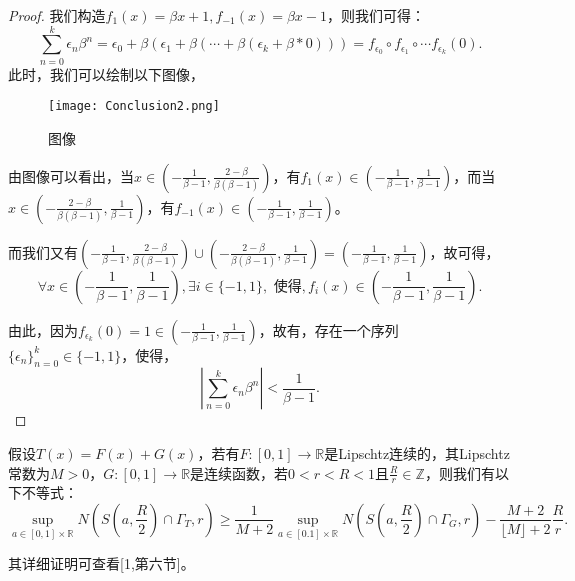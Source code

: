 \begin{proof}
      我们构造$f_1(x)=\beta x+1,f_{-1}(x)=\beta x -1$，则我们可得：
      $$
            \sum_{n=0}^k\epsilon_n\beta^n=\epsilon_0+\beta(\epsilon_1+\beta(\cdots+\beta(\epsilon_k+\beta*0)))=f_{\epsilon_0}\circ f_{\epsilon_1}\circ \cdots f_{\epsilon_k}(0).
      $$
      此时，我们可以绘制以下图像，
      \begin{figure*}[htbp]
            \centering
            \texttt{[image: Conclusion2.png]}
            \caption{图像}
            \label{fig:C1onclusion2}
      \end{figure*}

      由图像可以看出，当$x\in(-\frac{1}{\beta-1},\frac{2-\beta}{\beta(\beta-1)})$，有$f_1(x)\in(-\frac{1}{\beta-1},\frac{1}{\beta-1})$，而当$x\in(-\frac{2-\beta}{\beta(\beta-1)},\frac{1}{\beta-1})$，有$f_{-1}(x)\in(-\frac{1}{\beta-1},\frac{1}{\beta-1})$。

      而我们又有$(-\frac{1}{\beta-1},\frac{2-\beta}{\beta(\beta-1)})\cup(-\frac{2-\beta}{\beta(\beta-1)},\frac{1}{\beta-1})=(-\frac{1}{\beta-1},\frac{1}{\beta-1})$，故可得，
      $$
            \forall x\in(-\frac{1}{\beta-1},\frac{1}{\beta-1}), \exists i\in\{-1,1\},\mbox{ 使得},f_i(x)\in(-\frac{1}{\beta-1},\frac{1}{\beta-1}).
      $$

      由此，因为$f_{\epsilon_k}(0)=1\in(-\frac{1}{\beta-1},\frac{1}{\beta-1})$，故有，存在一个序列$\{\epsilon_n\}_{n=0}^{k}\in\{-1,1\}$，使得，
      $$
            |\sum_{n=0}^k\epsilon_n\beta^n|<\frac{1}{\beta-1}.
      $$
\end{proof}

\begin{lemma}
      假设$T(x)=F(x)+G(x)$，若有$F:[0,1]\rightarrow\mathbb{R}$是Lipschtz连续的，其Lipschtz常数为$M>0$，$G:[0,1]\rightarrow\mathbb{R}$是连续函数，若$0<r<R<1$且$\frac{R}{r}\in\mathbb{Z}$，则我们有以下不等式：
      $$
                  \underset{a\in[0,1]\times\mathbb{R}}{\sup} N(S(a,\frac{R}{2})\cap\Gamma_T,r)
                  \ge\frac{1}{M+2} \underset{a\in[0.1]\times\mathbb{R}}{\sup}N(S(a,\frac{R}{2})\cap\Gamma_G,r)-\frac{M+2}{\lfloor M\rfloor+2}\frac{R}{r}.
      $$
\end{lemma}

其详细证明可查看[1,第六节]。

